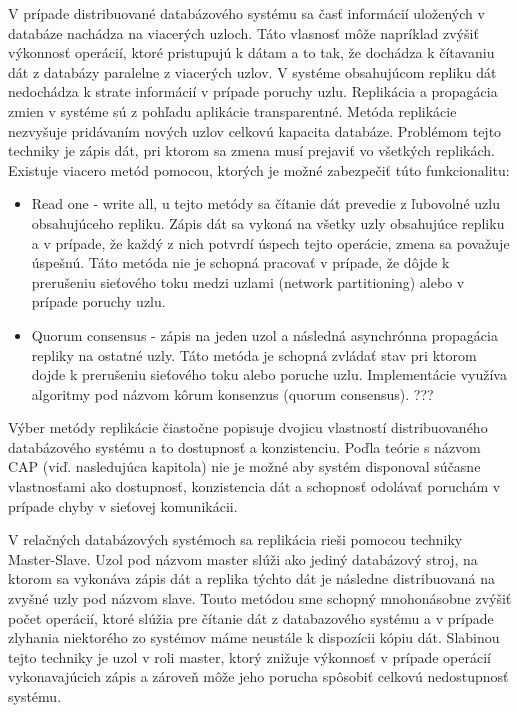 \documentclass[11pt,twoside,a4paper]{book}
\begin{document}
V prípade distribuované databázového systému sa časť informácií uložených v databáze nachádza na viacerých uzloch. Táto vlasnosť môže napríklad zvýšiť výkonnosť operácií, ktoré pristupujú k dátam a to tak, že dochádza k čítavaniu dát z databázy paralelne z viacerých uzlov. V systéme obsahujúcom repliku dát nedochádza k strate informácií v prípade poruchy uzlu. Replikácia a propagácia zmien v systéme sú z pohľadu aplikácie transparentné. Metóda replikácie nezvyšuje pridávaním nových uzlov celkovú kapacita databáze. Problémom tejto techniky je zápis dát, pri ktorom sa zmena musí prejaviť vo všetkých replikách. Existuje viacero metód pomocou, ktorých je možné zabezpečiť túto funkcionalitu:
\begin{itemize}
  \item
      Read one - write all, u tejto metódy sa čítanie dát prevedie z ľubovolné uzlu obsahujúceho repliku. Zápis dát sa vykoná na všetky uzly obsahujúce repliku a v prípade, že každý z nich potvrdí úspech tejto operácie, zmena sa považuje úspešnú. Táto metóda nie je schopná pracovať v prípade, že dôjde k prerušeniu sieťového toku medzi uzlami (network partitioning) alebo v prípade poruchy uzlu.
  \item
      Quorum consensus - zápis na jeden uzol a následná asynchrónna propagácia repliky na ostatné uzly. Táto metóda je schopná zvládať stav pri ktorom dojde k prerušeniu sieťového toku alebo poruche uzlu. Implementácie využíva algoritmy pod názvom kôrum konsenzus (quorum consensus). ???
\end{itemize}

Výber metódy replikácie čiastočne popisuje dvojicu vlastností distribuovaného databázového systému a to dostupnosť a konzistenciu. Poďla teórie s názvom CAP (viď. nasledujúca kapitola) nie je možné aby systém disponoval súčasne vlastnosťami ako dostupnosť, konzistencia dát a schopnosť odolávať poruchám v prípade chyby v sieťovej komunikácii.

V relačných databázových systémoch sa replikácia rieši pomocou techniky Master-Slave. Uzol pod názvom master slúži ako jediný databázový stroj, na ktorom sa vykonáva zápis dát a replika týchto dát je následne distribuovaná na zvyšné uzly pod názvom slave. Touto metódou sme schopný mnohonásobne zvýšiť počet operácií, ktoré slúžia pre čítanie dát z databazového systému a v prípade zlyhania niektorého zo systémov máme neustále k dispozícii kópiu dát. Slabinou tejto techniky je uzol v roli master, ktorý znižuje výkonnosť v prípade operácií vykonavajúcich zápis a zároveň môže jeho porucha spôsobiť celkovú nedostupnosť systému.
\end{document}
